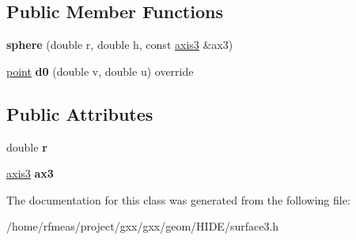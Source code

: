 \subsection*{Public Member Functions}
\begin{DoxyCompactItemize}
\item 
{\bfseries sphere} (double r, double h, const \hyperlink{classgxx_1_1geom3_1_1axis3}{axis3} \&ax3)\hypertarget{classgxx_1_1surf3_1_1sphere_a2723be12a5d4f0cde6d878a717f860b4}{}\label{classgxx_1_1surf3_1_1sphere_a2723be12a5d4f0cde6d878a717f860b4}

\item 
\hyperlink{classgxx_1_1geom3_1_1point}{point} {\bfseries d0} (double v, double u) override\hypertarget{classgxx_1_1surf3_1_1sphere_ab0fb9a7c107e66fc1c1ba7dab90183d8}{}\label{classgxx_1_1surf3_1_1sphere_ab0fb9a7c107e66fc1c1ba7dab90183d8}

\end{DoxyCompactItemize}
\subsection*{Public Attributes}
\begin{DoxyCompactItemize}
\item 
double {\bfseries r}\hypertarget{classgxx_1_1surf3_1_1sphere_a7cd8411a0f80b75775d9567aa2bb15a5}{}\label{classgxx_1_1surf3_1_1sphere_a7cd8411a0f80b75775d9567aa2bb15a5}

\item 
\hyperlink{classgxx_1_1geom3_1_1axis3}{axis3} {\bfseries ax3}\hypertarget{classgxx_1_1surf3_1_1sphere_aee9b9576ec49bf0e015ab3e7adfecbf7}{}\label{classgxx_1_1surf3_1_1sphere_aee9b9576ec49bf0e015ab3e7adfecbf7}

\end{DoxyCompactItemize}


The documentation for this class was generated from the following file\+:\begin{DoxyCompactItemize}
\item 
/home/rfmeas/project/gxx/gxx/geom/\+H\+I\+D\+E/surface3.\+h\end{DoxyCompactItemize}
